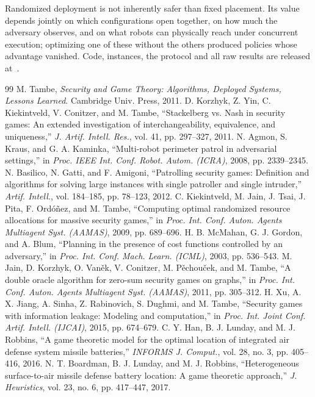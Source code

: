 \documentclass[letterpaper,journal]{IEEEtran}
\theoremstyle{remark}
\begin{document}
Randomized deployment is not inherently safer than fixed placement. Its value depends jointly on which configurations open together, on how much the adversary observes, and on what robots can physically reach under concurrent execution; optimizing one of these without the others produced policies whose advantage vanished. Code, instances, the protocol and all raw results are released at~\cite{alam2026code}.

\small
\begin{thebibliography}{99}
 M. Tambe, \emph{Security and Game Theory: Algorithms, Deployed Systems, Lessons Learned}. Cambridge Univ. Press, 2011.
 D. Korzhyk, Z. Yin, C. Kiekintveld, V. Conitzer, and M. Tambe, ``Stackelberg vs. Nash in security games: An extended investigation of interchangeability, equivalence, and uniqueness,'' \emph{J. Artif. Intell. Res.}, vol. 41, pp. 297--327, 2011.
 N. Agmon, S. Kraus, and G. A. Kaminka, ``Multi-robot perimeter patrol in adversarial settings,'' in \emph{Proc. IEEE Int. Conf. Robot. Autom. (ICRA)}, 2008, pp. 2339--2345.
 N. Basilico, N. Gatti, and F. Amigoni, ``Patrolling security games: Definition and algorithms for solving large instances with single patroller and single intruder,'' \emph{Artif. Intell.}, vol. 184--185, pp. 78--123, 2012.
 C. Kiekintveld, M. Jain, J. Tsai, J. Pita, F. Ord\'o\~nez, and M. Tambe, ``Computing optimal randomized resource allocations for massive security games,'' in \emph{Proc. Int. Conf. Auton. Agents Multiagent Syst. (AAMAS)}, 2009, pp. 689--696.
 H. B. McMahan, G. J. Gordon, and A. Blum, ``Planning in the presence of cost functions controlled by an adversary,'' in \emph{Proc. Int. Conf. Mach. Learn. (ICML)}, 2003, pp. 536--543.
 M. Jain, D. Korzhyk, O. Van\v{e}k, V. Conitzer, M. P\v{e}chou\v{c}ek, and M. Tambe, ``A double oracle algorithm for zero-sum security games on graphs,'' in \emph{Proc. Int. Conf. Auton. Agents Multiagent Syst. (AAMAS)}, 2011, pp. 305--312.
 H. Xu, A. X. Jiang, A. Sinha, Z. Rabinovich, S. Dughmi, and M. Tambe, ``Security games with information leakage: Modeling and computation,'' in \emph{Proc. Int. Joint Conf. Artif. Intell. (IJCAI)}, 2015, pp. 674--679.
 C. Y. Han, B. J. Lunday, and M. J. Robbins, ``A game theoretic model for the optimal location of integrated air defense system missile batteries,'' \emph{INFORMS J. Comput.}, vol. 28, no. 3, pp. 405--416, 2016.
 N. T. Boardman, B. J. Lunday, and M. J. Robbins, ``Heterogeneous surface-to-air missile defense battery location: A game theoretic approach,'' \emph{J. Heuristics}, vol. 23, no. 6, pp. 417--447, 2017.

\end{thebibliography}
\end{document}
